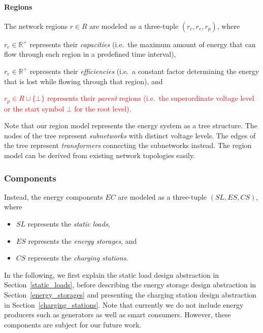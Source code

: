 \paragraph{Regions}
\label{regions}

The network regions $r \in R$ are modeled as a three-tuple $(r_c, r_e, r_p)$, where
\begin{itemize}
	\item $r_c \in \mathbb{R}^+$ represents their \textit{capacities} (i.e.\ the maximum amount of energy that can flow through each region in a predefined time interval),
	\item $r_e \in \mathbb{R}^+$ represents their \textit{efficiencies} (i.e.\ a constant factor determining the energy that is lost while flowing through that region), and
	\textcolor{red}{
	\item $r_p \in R \cup \{\bot\}$ represents their \textit{parent} regions (i.e.\ the superordinate voltage level or the start symbol $\bot$ for the root level).
}
\end{itemize}
Note that our region model represents the energy system as a tree structure. The nodes of the tree represent \textit{subnetworks} with distinct voltage levels. The edges of the tree represent \textit{transformers} connecting the subnetworks instead. The region model can be derived from existing network topologies easily.

\subsubsection{Components}
\label{components}

Instead, the energy components $EC$ are modeled as a three-tuple $(SL, ES, CS)$, where
\begin{itemize}
	\item $SL$ represents the \textit{static loads},
	\item $ES$ represents the \textit{energy storages}, and
	\item $CS$ represents the \textit{charging stations}.
\end{itemize}
In the following, we first explain the static load design abstraction in Section~\ref{static_loads}, before describing the energy storage design abstraction in Section~\ref{energy_storages} and presenting the charging station design abstraction in Section~\ref{charging_stations}. Note that currently we do not include energy producers such as generators as well as smart consumers. However, these components are subject for our future work.

